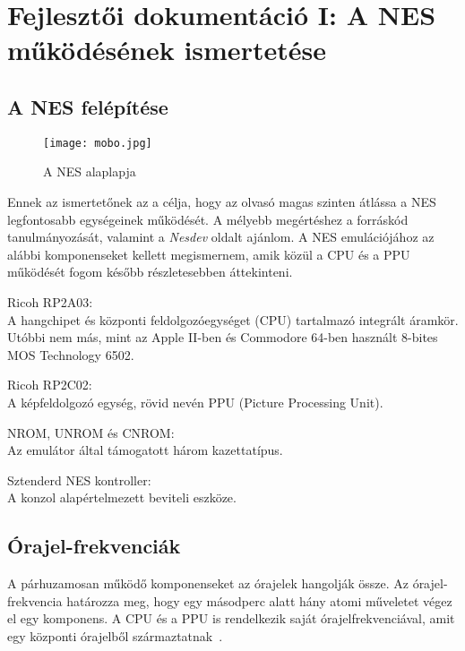 \chapter{Fejlesztői dokumentáció I: A NES működésének ismertetése} %
\label{ch:impl}

\section{A NES felépítése}

\begin{figure}[H]
	\centering
	\texttt{[image: mobo.jpg]}
	\caption{A NES alaplapja\protect\footnotemark}
\end{figure}

Ennek az ismertetőnek az a célja, hogy az olvasó magas szinten átlássa a NES legfontosabb egységeinek működését. A mélyebb megértéshez a forráskód tanulmányozását, valamint a \emph{Nesdev}\cite{ref} oldalt ajánlom.
A NES emulációjához az alábbi komponenseket kellett megismernem, amik közül a CPU és a PPU működését fogom később részletesebben áttekinteni.

\begin{compactdesc}
	\item[Ricoh RP2A03:] 
	\hfill \\
	A hangchipet és központi feldolgozóegységet (CPU) tartalmazó integrált áramkör. Utóbbi nem más, mint az Apple II-ben és Commodore 64-ben használt 8-bites MOS Technology 6502.
	\item[Ricoh RP2C02:]
	\hfill \\
	A képfeldolgozó egység, rövid nevén PPU (Picture Processing Unit).
	\item[NROM\cite{nromref}, UNROM\cite{unromref} és CNROM\cite{cnromref}:] 
	\hfill \\
	Az emulátor által támogatott három kazettatípus.
	\item[Sztenderd NES kontroller\cite{control}:]
	\hfill \\
	A konzol alapértelmezett beviteli eszköze.
\end{compactdesc}

\section{Órajel-frekvenciák}
A párhuzamosan működő komponenseket az órajelek hangolják össze. Az órajel-frekvencia határozza meg, hogy egy másodperc alatt hány atomi műveletet végez el egy komponens.
A CPU és a PPU is rendelkezik saját órajelfrekvenciával, amit egy központi órajelből származtatnak~\cite{nesclocks}.

